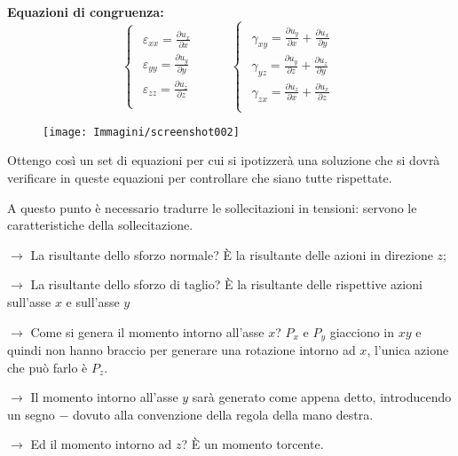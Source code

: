 \documentclass{article}
\begin{document}
\begin{adjustwidth}{2in}{}
	\textbf{Equazioni di congruenza:}
\[ 
\begin{cases}
	\begin{aligned}
		\varepsilon_{xx} =   \frac{\partial u_x}{\partial x} \\
		\varepsilon_{yy} =   \frac{\partial u_y}{\partial y} \\
		\varepsilon_{zz} =   \frac{\partial u_z}{\partial z} \\
	\end{aligned}
\end{cases} \hspace{1cm} \begin{cases}
	\begin{aligned}
		\gamma_{xy} =   \frac{\partial u_y}{\partial x} + \frac{\partial u_x}{\partial y} \\
		\gamma_{yz} =   \frac{\partial u_y}{\partial z} + \frac{\partial u_z}{\partial y} \\
		\gamma_{zx} =   \frac{\partial u_z}{\partial x} + \frac{\partial u_x}{\partial z} \\
	\end{aligned}
\end{cases}
\]
\begin{figure}[H]
	\centering
	\texttt{[image: Immagini/screenshot002]}
	\label{fig:screenshot002}
\end{figure}
Ottengo così un set di equazioni per cui si ipotizzerà una soluzione che si dovrà verificare in queste equazioni per controllare che siano tutte rispettate. \newline 

A questo punto è necessario tradurre le sollecitazioni in tensioni: servono le caratteristiche della sollecitazione. 

\item[$\rightarrow$] La risultante dello sforzo normale? È la risultante delle azioni in direzione $z$; 
\item[$\rightarrow$] La risultante dello sforzo di taglio? È la risultante delle rispettive azioni sull'asse $x$ e sull'asse $y$
\item[$\rightarrow$] Come si genera il momento intorno all'asse $x$? $P_x$ e $P_y$ giacciono in $xy$ e quindi non hanno braccio per generare una rotazione intorno ad $x$, l'unica azione che può farlo è $P_z$.
\item[$\rightarrow$] Il momento intorno all'asse $y$ sarà generato come appena detto, introducendo un segno $-$ dovuto alla convenzione della regola della mano destra. 
\item[$\rightarrow$] Ed il momento intorno ad $z$? È un momento torcente. 


\end{adjustwidth}
\end{document}
